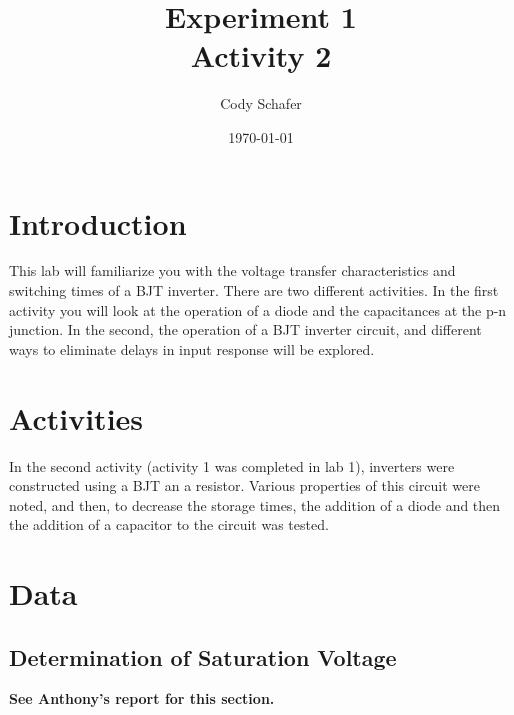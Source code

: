 \documentclass[10pt]{article}
\title{\textbf{Experiment 1} \\
	Activity 2}
\author{Cody Schafer}
\date{\today}
\begin{document}
\maketitle
\section{Introduction}

	This lab will familiarize you with the voltage transfer
	characteristics and switching times of a BJT inverter.  There are
	two different activities.  In the first activity you will look at
	the operation of a diode and the capacitances at the p-n junction.
	In the second, the operation of a BJT inverter circuit, and
	different ways to eliminate delays in input response will be
	explored.    

\section{Activities}

	In the second activity (activity 1 was completed in lab 1),
	inverters were constructed using a BJT an a resistor. Various
	properties of this circuit were noted, and then, to decrease the
	storage times, the addition of a diode and then the addition of a
	capacitor to the circuit was tested.

\section{Data}

	\subsection{Determination of Saturation Voltage}
	\textbf{See Anthony's report for this section.}
\end{document}
